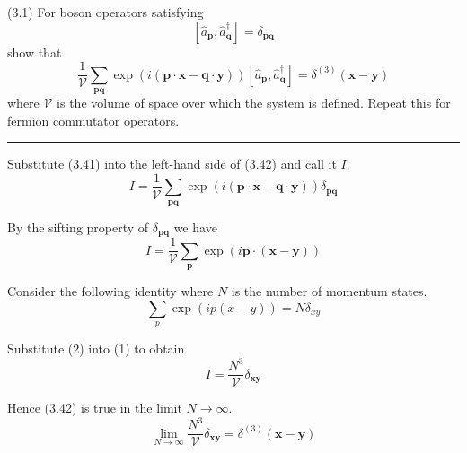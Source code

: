 \documentclass[12pt]{article}
\begin{document}
(3.1)
For boson operators satisfying
\begin{equation*}
\left[\hat a_{\mathbf p},\hat a_{\mathbf q}^\dag\right]=\delta_\mathbf{pq}
\tag{3.41}
\end{equation*}
show that
\begin{equation*}
\frac{1}{\mathcal V}\sum_\mathbf{pq}
\exp(i(\mathbf p\cdot\mathbf x-\mathbf q\cdot\mathbf y))
\left[\hat a_{\mathbf p},\hat a_{\mathbf q}^\dag\right]
=\delta^{(3)}(\mathbf x-\mathbf y)
\tag{3.42}
\end{equation*}
where $\mathcal V$ is the volume of space over which the system
is defined.
Repeat this for fermion commutator operators.

\bigskip
\hrule

\bigskip
Substitute (3.41) into the left-hand side of (3.42) and call it $I$.
\begin{equation*}
I=\frac{1}{\mathcal V}\sum_\mathbf{pq}
\exp(i(\mathbf p\cdot\mathbf x-\mathbf q\cdot\mathbf y))
\delta_\mathbf{pq}
\end{equation*}

By the sifting property of $\delta_\mathbf{pq}$ we have
\begin{equation*}
I=\frac{1}{\mathcal V}\sum_\mathbf{p}
\exp(i\mathbf p\cdot(\mathbf x-\mathbf y))
\tag{1}
\end{equation*}

Consider the following identity where $N$ is the number of momentum states.
\begin{equation*}
\sum_p\exp(ip(x-y))=N\delta_{xy}
\tag{2}
\end{equation*}

Substitute (2) into (1) to obtain
\begin{equation*}
I=\frac{N^3}{\mathcal V}\delta_\mathbf{xy}
\end{equation*}

Hence (3.42) is true in the limit $N\rightarrow\infty$.
\begin{equation*}
\lim_{N\rightarrow\infty}\frac{N^3}{\mathcal V}
\delta_\mathbf{xy}
=\delta^{(3)}(\mathbf x-\mathbf y)
\end{equation*}
\end{document}

